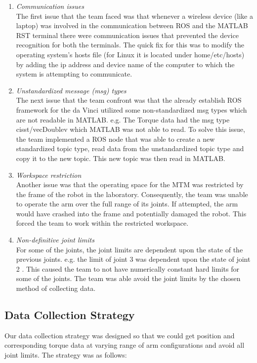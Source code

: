 \documentclass[conference]{IEEEtran}
\begin{document}
\begin{enumerate}

		\item\textit{ Communication issues } \\ The first issue that the team faced was that whenever a wireless device (like a laptop) was involved in the communication between ROS and the MATLAB RST terminal there were communication issues that prevented the device recognition for both the terminals. The quick fix for this was to modify the operating system's hosts file (for Linux it is located under home/etc/hosts) by adding the ip address and device name of the computer to which the system is attempting to communicate.
        
        \item \textit{Unstandardized message (msg) types} \\ The next issue that the team confront was that the already establish ROS framework for the da Vinci utilized some non-standardized msg types which are not readable in MATLAB. e.g. The Torque data had the msg type cisst/vecDoublev which MATLAB was not able to read. To solve this issue, the team implemented a ROS node that was able to create a new standardized topic type, read data from the unstandardized topic type and copy it to the new topic. This new topic was then read in MATLAB.

		\item \textit{Workspace restriction }\\ Another issue was that the operating space for the MTM was restricted by the frame of the robot in the laboratory. Consequently, the team was unable to operate the arm over the full range of its joints. If attempted, the arm would have crashed into the frame and potentially damaged the robot. This forced the team to work within the restricted workspace.
        
        \item \textit{Non-definitive joint limits} \\ For some of the joints, the joint limits are dependent upon the state of the previous joints. e.g. the limit of joint 3 was dependent upon the state of joint 2 . This caused the team to not have numerically constant hard limits for some of the joints. The team was able avoid the joint limits by the chosen method of collecting data.

\end{enumerate}


\subsection{Data Collection Strategy}
Our data collection strategy was designed so that we could get position and corresponding torque data at varying range of arm configurations and avoid all joint limits. The strategy was as follows:
\end{document}
